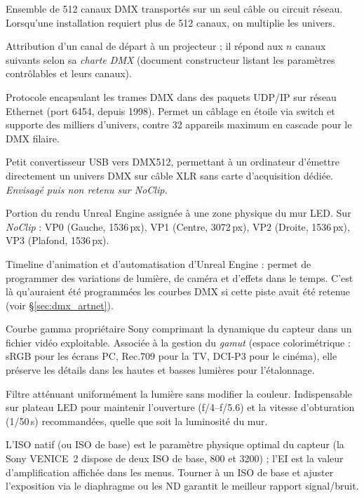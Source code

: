 \documentclass[11pt,a4paper]{report}
\begin{document}
\begin{description}[leftmargin=3.4cm,style=nextline,font=\bfseries\color{braccent}]
\item[Univers DMX] Ensemble de 512 canaux DMX transportés sur un seul câble ou circuit réseau. Lorsqu'une installation requiert plus de 512 canaux, on multiplie les univers.
\item[Adressage DMX] Attribution d'un canal de départ à un projecteur ; il répond aux $n$ canaux suivants selon sa \emph{charte DMX} (document constructeur listant les paramètres contrôlables et leurs canaux).
\item[Art-Net] Protocole encapsulant les trames DMX dans des paquets UDP/IP sur réseau Ethernet (port 6454, depuis 1998). Permet un câblage en étoile via switch et supporte des milliers d'univers, contre 32 appareils maximum en cascade pour le DMX filaire.
\item[nodle USB-DMX] Petit convertisseur USB vers DMX512, permettant à un ordinateur d'émettre directement un univers DMX sur câble XLR sans carte d'acquisition dédiée. \emph{Envisagé puis non retenu sur \textit{NoClip}.}
\item[Viewport \texttt{nDisplay} (VP)] Portion du rendu Unreal Engine assignée à une zone physique du mur LED. Sur \textit{NoClip} : VP0 (Gauche, 1536\,px), VP1 (Centre, 3072\,px), VP2 (Droite, 1536\,px), VP3 (Plafond, 1536\,px).
\item[Sequencer (UE5)] Timeline d'animation et d'automatisation d'Unreal Engine : permet de programmer des variations de lumière, de caméra et d'effets dans le temps. C'est là qu'auraient été programmées les courbes DMX si cette piste avait été retenue (voir §\ref{sec:dmx_artnet}).
\item[S-Log3] Courbe gamma propriétaire Sony comprimant la dynamique du capteur dans un fichier vidéo exploitable. Associée à la gestion du \emph{gamut} (espace colorimétrique : sRGB pour les écrans PC, Rec.709 pour la TV, DCI-P3 pour le cinéma), elle préserve les détails dans les hautes et basses lumières pour l'étalonnage.
\item[ND (Neutral Density)] Filtre atténuant uniformément la lumière sans modifier la couleur. Indispensable sur plateau LED pour maintenir l'ouverture (f/4--f/5.6) et la vitesse d'obturation (1/50\,s) recommandées, quelle que soit la luminosité du mur.
\item[ISO natif / Exposure Index (EI)] L'ISO natif (ou ISO de base) est le paramètre physique optimal du capteur (la Sony VENICE~2 dispose de deux ISO de base, 800 et 3200) ; l'EI est la valeur d'amplification affichée dans les menus. Tourner à un ISO de base et ajuster l'exposition via le diaphragme ou les ND garantit le meilleur rapport signal/bruit.

\end{description}
\end{document}
